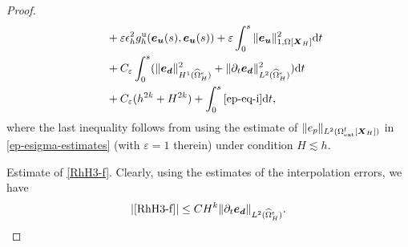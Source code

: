 \documentclass[11pt,reqno]{amsart}
\theoremstyle{definition}
\theoremstyle{plain}
\numberwithin{theorem}{section}
\numberwithin{proposition}{section}
\numberwithin{lemma}{section}
\numberwithin{equation}{section}
\newcommand{\bs}[1]{\boldsymbol{#1}}
\newcommand{\dep}{{{\bs{d}}}}
\def\d{\mathrm{d}}
\renewcommand{\(}{\bigl(}
\renewcommand{\)}{\bigr)}
\begin{document}
\begin{proof}
\begin{align}
&\quad\, + \varepsilon \epsilon_h^2 g^{\rm u}_h({\bs e}_{\bs u}(s),{\bs e}_{\bs u}(s)) + \varepsilon \int_0^s \|{\bs e}_{\bs u}\|_{1,\Omega[{\bs X}_H]}^2  \d t \notag\\
&\quad\, + C_\varepsilon  \int_0^s (\|{\bs e}_\dep\|_{H^1(\widehat{\Omega}^{\rm s}_H)}^2 + \|\partial_t{\bs e}_\dep\|_{L^2(\widehat{\Omega}^{\rm s}_H)}^2) \d t \notag\\
&\quad\, 
+ C_\varepsilon (h^{2k} + H^{2k}) + \int_0^s \eqref{ep-eq-i} \d t ,
\end{align}
where the last inequality follows from using the estimate of $\|e_p\|_{L^2(\Omega_{\rm ext}^{\rm f}[\bs X_H])}$ in \eqref{ep-esigma-estimates} (with $\varepsilon=1$ therein) under condition $H\lesssim h$.

 Estimate of \eqref{RhH3-f}. Clearly, using the estimates of the interpolation errors, we have 
\begin{align}
|\eqref{RhH3-f}|
\le CH^k \|\partial_t{\bs e}_{\bs d}\|_{L^2(\widehat{\Omega}_H^{\rm s})}. 
\end{align}


\end{proof}
\end{document}
